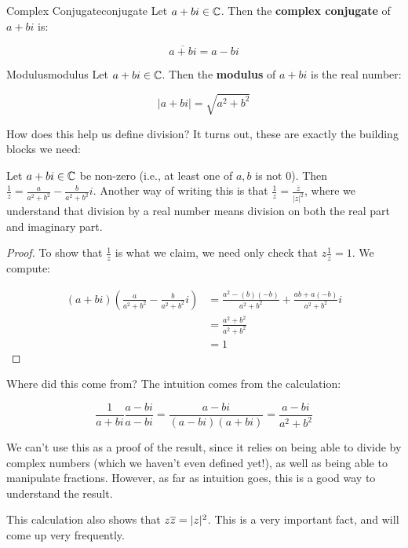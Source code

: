 \begin{defbo}{Complex Conjugate}{conjugate} 
Let $a+bi \in \mathbb{C}$. Then the {\bf complex conjugate} of $a+bi$ is:

$$\overline{a+bi} = a-bi$$
\end{defbo}

\begin{defbo}{Modulus}{modulus} 
Let $a+bi \in \mathbb{C}$. Then the {\bf modulus} of $a+bi$ is the real number:

$$|a+bi| = \sqrt{a^2 + b^2}$$
\end{defbo}

How does this help us define division? It turns out, these are exactly the building blocks we need:

\begin{lem}Let $a+bi\in \mathbb{C}$ be non-zero (i.e., at least one of $a,b$ is not 0). Then $\frac{1}{z} = \frac{a}{a^2 + b^2} - \frac{b}{a^2 + b^2}i$. Another way of writing this is that $\frac{1}{z} = \frac{\overline{z}}{\left|z\right|^2}$, where we understand that division by a real number means division on both the real part and imaginary part.\end{lem}

\begin{proof} To show that $\frac{1}{z}$ is what we claim, we need only check that $z\frac{1}{z} = 1$. We compute:

\begin{align*}(a+bi)\left(\frac{a}{a^2 + b^2} - \frac{b}{a^2 + b^2}i\right) &= \frac{a^2 -(b)(-b)}{a^2 + b^2} + \frac{ab + a(-b)}{a^2 + b^2}i\\
&= \frac{a^2 + b^2}{a^2 + b^2}\\
&= 1\end{align*}

\end{proof}

Where did this come from? The intuition comes from the calculation:

$$\frac{1}{a+bi}{\frac{a-bi}{a-bi}} = \frac{a-bi}{(a-bi)(a+bi)} = \frac{a-bi}{a^2 + b^2}$$

We can't use this as a proof of the result, since it relies on being able to divide by complex numbers (which we haven't even defined yet!), as well as being able to manipulate fractions. However, as far as intuition goes, this is a good way to understand the result.

\begin{note} This calculation also shows that $z\overline{z} = |z|^2$. This is a very important fact, and will come up very frequently.\end{note}


